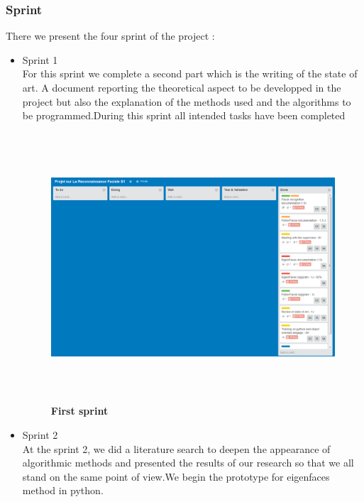 \subsubsection{Sprint}
There we present the four sprint of the project :
\begin{itemize}
\item Sprint 1 
\\For this sprint we complete a second part which is the writing of the state of art. A document reporting the theoretical aspect to be developped in the project but also the explanation of the methods used and the algorithms to be programmed.During this sprint all intended tasks  have been completed
\begin{figure}[bth]%
\begin{center}
\includegraphics[scale=0.60,height=10cm,width=17cm]{sprint1}
\caption{\textbf{First sprint }}%
\end {center}
\end{figure}
\newpage
\item Sprint 2 
\\At  the sprint 2, we did a literature search to deepen the appearance of algorithmic methods and presented the results of our research so that we all stand on the same point of view.We begin the prototype for eigenfaces method  in python. 
\begin{figure}[bth]%
\begin{center}

\end{center}
\end{figure}
\end{itemize}

